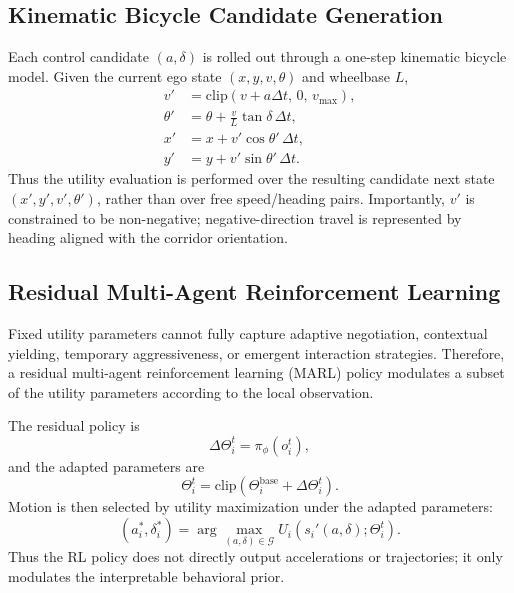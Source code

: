 \documentclass[conference]{IEEEtran}
\begin{document}
\subsection{Kinematic Bicycle Candidate Generation}
Each control candidate $(a,\delta)$ is rolled out through a one-step kinematic bicycle model. Given the current ego state $(x,y,v,\theta)$ and wheelbase $L$,
\begin{equation}
\begin{aligned}
v'
&=
\mathrm{clip}\!\left(v+a\Delta t,\,0,\,v_{\max}\right),\\
\theta'
&=
\theta+\frac{v}{L}\tan\delta\,\Delta t,\\
x'
&=
x+v'\cos\theta'\,\Delta t,\\
y'
&=
y+v'\sin\theta'\,\Delta t.
\end{aligned}
\end{equation}
Thus the utility evaluation is performed over the resulting candidate next state $(x',y',v',\theta')$, rather than over free speed/heading pairs. Importantly, $v'$ is constrained to be non-negative; negative-direction travel is represented by heading aligned with the corridor orientation.

\subsection{Residual Multi-Agent Reinforcement Learning}
Fixed utility parameters cannot fully capture adaptive negotiation, contextual yielding, temporary aggressiveness, or emergent interaction strategies. Therefore, a residual multi-agent reinforcement learning (MARL) policy modulates a subset of the utility parameters according to the local observation.

The residual policy is
\begin{equation}
\Delta\Theta_{i}^{t}=\pi_{\phi}(o_{i}^{t}),
\end{equation}
and the adapted parameters are
\begin{equation}
\Theta_{i}^{t}
=
\mathrm{clip}\!\left(
\Theta_{i}^{\mathrm{base}}+\Delta\Theta_{i}^{t}
\right).
\end{equation}
Motion is then selected by utility maximization under the adapted parameters:
\begin{equation}
(a_{i}^{*},\delta_{i}^{*})
=
\arg\max_{(a,\delta)\in\mathcal{G}}
U_{i}\!\left(s_{i}'(a,\delta);\Theta_{i}^{t}\right).
\end{equation}
Thus the RL policy does not directly output accelerations or trajectories; it only modulates the interpretable behavioral prior.
\end{document}
